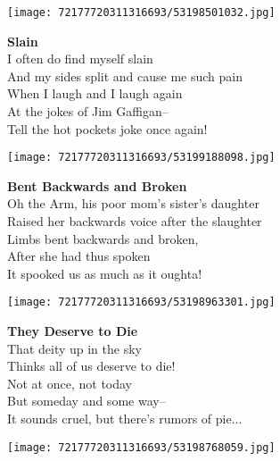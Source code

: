 \documentclass[10pt,letterpaper]{article}
\begin{document}
\begin{center}
\texttt{[image: 72177720311316693/53198501032.jpg]}
\end{center}

\begin{center}
\textbf{Slain}\\
\vskip 0.2in
I often do find myself slain\\
And my sides split and cause me such pain\\
When I laugh and I laugh again\\
At the jokes of Jim Gaffigan--\\
Tell the hot pockets joke once again!\\
\end{center}
\pagebreak

\begin{center}
\texttt{[image: 72177720311316693/53199188098.jpg]}
\end{center}

\begin{center}
\textbf{Bent Backwards and Broken}\\
\vskip 0.2in
Oh the Arm, his poor mom's sister's daughter\\
Raised her backwards voice after the slaughter\\
Limbs bent backwards and broken,\\
After she had thus spoken\\
It spooked us as much as it oughta!\\
\end{center}
\pagebreak

\begin{center}\texttt{[image: 72177720311316693/53198963301.jpg]}
\end{center}
\begin{center}
\textbf{They Deserve to Die}\\
\vskip 0.2in
That deity up in the sky\\
Thinks all of us deserve to die!\\
Not at once, not today\\
But someday and some way--\\
It sounds cruel, but there's rumors of pie...\\
\end{center}
\pagebreak

\begin{center}
\texttt{[image: 72177720311316693/53198768059.jpg]}
\end{center}
\end{document}
